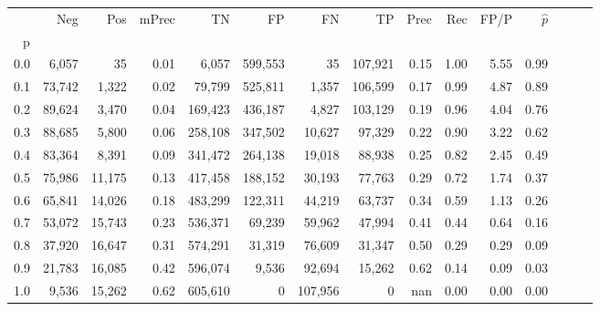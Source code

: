 \begin{tabular}{rrrrrrrrrrrrrrr}
\toprule
{} &     Neg &     Pos & mPrec &       TN &       FP &       FN &       TP &  Prec &   Rec &  FP/P & $\hat{p}$ \\
p   &         &         &       &          &          &          &          &       &       &       &           \\
\midrule
0.0 &   6,057 &      35 &  0.01 &    6,057 &  599,553 &       35 &  107,921 &  0.15 &  1.00 &  5.55 &      0.99 \\
0.1 &  73,742 &   1,322 &  0.02 &   79,799 &  525,811 &    1,357 &  106,599 &  0.17 &  0.99 &  4.87 &      0.89 \\
0.2 &  89,624 &   3,470 &  0.04 &  169,423 &  436,187 &    4,827 &  103,129 &  0.19 &  0.96 &  4.04 &      0.76 \\
0.3 &  88,685 &   5,800 &  0.06 &  258,108 &  347,502 &   10,627 &   97,329 &  0.22 &  0.90 &  3.22 &      0.62 \\
0.4 &  83,364 &   8,391 &  0.09 &  341,472 &  264,138 &   19,018 &   88,938 &  0.25 &  0.82 &  2.45 &      0.49 \\
0.5 &  75,986 &  11,175 &  0.13 &  417,458 &  188,152 &   30,193 &   77,763 &  0.29 &  0.72 &  1.74 &      0.37 \\
0.6 &  65,841 &  14,026 &  0.18 &  483,299 &  122,311 &   44,219 &   63,737 &  0.34 &  0.59 &  1.13 &      0.26 \\
0.7 &  53,072 &  15,743 &  0.23 &  536,371 &   69,239 &   59,962 &   47,994 &  0.41 &  0.44 &  0.64 &      0.16 \\
0.8 &  37,920 &  16,647 &  0.31 &  574,291 &   31,319 &   76,609 &   31,347 &  0.50 &  0.29 &  0.29 &      0.09 \\
0.9 &  21,783 &  16,085 &  0.42 &  596,074 &    9,536 &   92,694 &   15,262 &  0.62 &  0.14 &  0.09 &      0.03 \\
1.0 &   9,536 &  15,262 &  0.62 &  605,610 &        0 &  107,956 &        0 &   nan &  0.00 &  0.00 &      0.00 \\
\bottomrule
\end{tabular}
